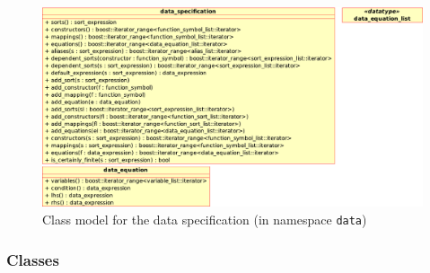 \documentclass[a4paper,11pt]{article}
\begin{document}
\begin{figure}[htp]
    \begin{center}
      \includegraphics[width=\textwidth]{specification}
      \caption{Class model for the data specification (in namespace \texttt{data})}
      \label{fig:class_specification}
    \end{center}
  \end{figure}

\subsubsection{Classes}
\end{document}
